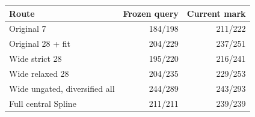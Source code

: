 \begin{tabular}{lrr}
\toprule
Route & Frozen query & Current mark \\
\midrule
Original 7 & 184/198 & 211/222 \\
Original 28 + fit & 204/229 & 237/251 \\
Wide strict 28 & 195/220 & 216/241 \\
Wide relaxed 28 & 204/235 & 229/253 \\
Wide ungated, diversified all & 244/289 & 243/293 \\
Full central Spline & 211/211 & 239/239 \\
\bottomrule
\end{tabular}
